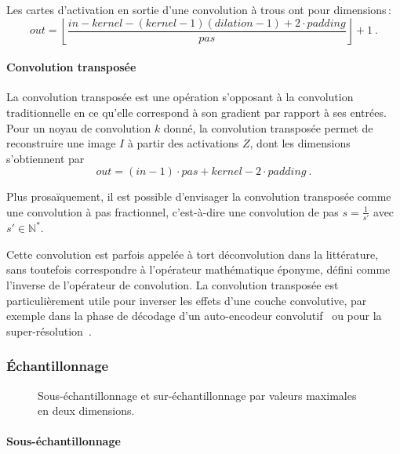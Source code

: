 Les cartes d'activation en sortie d'une convolution à trous ont pour dimensions\,:
$$\mathit{out} = \left\lfloor \frac{\mathit{in} - \mathit{kernel} - (\mathit{kernel} -1)(\mathit{dilation} - 1) + 2 \cdot \mathit{padding}}{\mathit{pas}}\right\rfloor + 1~.$$


\paragraph{Convolution transposée}

La convolution transposée est une opération s'opposant à la convolution traditionnelle en ce qu'elle correspond à son gradient par rapport à ses entrées. Pour un noyau de convolution $k$ donné, la convolution transposée permet de reconstruire une image $I$ à partir des activations $Z$, dont les dimensions s'obtiennent par
$$\mathit{out} = (\mathit{in} - 1) \cdot \mathit{pas} + \mathit{kernel} - 2 \cdot \mathit{padding}~.$$

Plus prosaïquement, il est possible d'envisager la convolution transposée comme une convolution à pas fractionnel, c'est-à-dire une convolution de pas $s = \frac{1}{s'}$ avec $s' \in \mathbb{N}^*$.

Cette convolution est parfois appelée à tort \og déconvolution \fg dans la littérature, sans toutefois correspondre à l'opérateur mathématique éponyme, défini comme l'inverse de l'opérateur de convolution. La convolution transposée est particulièrement utile pour inverser les effets d'une couche convolutive, par exemple dans la phase de décodage d'un auto-encodeur convolutif~\cite{zhao_stacked_2015} ou pour la super-résolution~\cite{dong_accelerating_2016}.

\subsubsection{Échantillonnage}

\begin{figure}
  \resizebox{\textwidth}{!}{
  
  }
  \caption{Sous-échantillonnage et sur-échantillonnage par valeurs maximales en deux dimensions.}
  \label{fig:pooling}
\end{figure}

\paragraph{Sous-échantillonnage}

